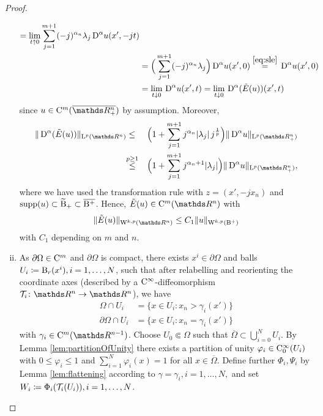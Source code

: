 \begin{proof}
\begin{enumerate}[i)]
\begin{align*}
        = \lim_{t \uparrow 0} \sum_{j = 1}^{m + 1} (-j)^{\alpha_n} \lambda_j \,{\operatorname{D}}^\alpha u(x', -jt) \\
        &= \Big(\sum_{j = 1}^{m + 1} (-j)^{\alpha_n} \lambda_j \Big) \,{\operatorname{D}}^\alpha u (x',0)
        \overset{\eqref{eq:sle}}{=} \,{\operatorname{D}}^\alpha u(x', 0) \\
        &= \lim_{t \downarrow 0} \,{\operatorname{D}}^\alpha u(x', t) 
        = \lim_{t \downarrow 0} \,{\operatorname{D}}^\alpha(\tilde E(u))(x', t)
      \end{align*}
      since $u \in \CC^m(\overline{\R^n_+})$ by assumption.
      Moreover,
      \begin{alignat*}{2}
        \|\DD^\alpha(\tilde E(u)) \|_{\Ell^p(\R^n)}
        &\leq &&\Big( 1 + \sum_{j = 1}^{m + 1} j^{\alpha_n} |\lambda_j|\, j^{\frac{1}{p}} \Big) \|\DD^\alpha u\|_{\Ell^p(\R^n_+)}  \\
        &\hspace{-0.3em}\overset{p \geq 1}{\leq} &&\Big( 1 + \sum_{j = 1}^{m + 1} j^{\alpha_n + 1} |\lambda_j| \Big) \|\DD^\alpha u\|_{\Ell^p(\R^n_+)},
      \end{alignat*}
      where we have used the transformation rule with $z = (x', -jx_n)$ and $\operatorname{supp}(u) \subset \widetilde {\mathrm{B}}_+ \subset \overline{\mathrm{B}^+}$.
      Hence, $\tilde E(u) \in\CC^m(\R^n)$ with
      \begin{equation}
        \label{eq:contExt}
        \|\tilde E (u)\|_{\WW^{k,p}(\R^n)} \leq C_1 \|u\|_{\WW^{k,p}(\BB^+)}
      \end{equation}
      with $C_1$ depending on $m$ and $n$.

    \item As $\partial \Omega \in \mathrm{C}^m$ and $\partial \Omega$ is compact, there exists $x^i \in \partial\Omega$ and balls $U_i \coloneqq \mathrm{B}_r(x^i), i = 1,\dots,N$, such that after relabelling and reorienting the coordinate axes (described by a $\mathrm{C}^\infty$\hyp{}diffeomorphism $\Tau_i \colon \R^n \to \R^n$), we have
      \begin{align*}
        \Omega \cap U_i &= \{ x \in U_i \colon x_n > \gamma_i(x') \} \\
        \partial\Omega \cap U_i &= \{x \in U_i \colon x_n = \gamma_i(x')\}
      \end{align*}
      with $\gamma_i \in \CC^m(\R^{n - 1})$.
      Choose $U_0 \Subset \Omega$ such that $\overline\Omega \subset \bigcup_{i = 0}^N U_i$.
      By Lemma \ref{lem:partitionOfUnity} there exists a partition of unity $\varphi_i \in \mathrm{C}_0^\infty(U_i)$ with $0 \leq \varphi_i \leq 1$ and $\sum_{i = 1}^N \varphi_i(x) = 1$ for all $x \in \overline\Omega$.
      Define further $\Phi_i,\Psi_i$ by Lemma \ref{lem:flattening} according to $\gamma = \gamma_i, i = 1,\dots,N,$ and set $W_i \coloneqq \Phi_i(\mathcal{T}_i(U_i)), i = 1,\dots,N$.


\end{enumerate}
\end{proof}
